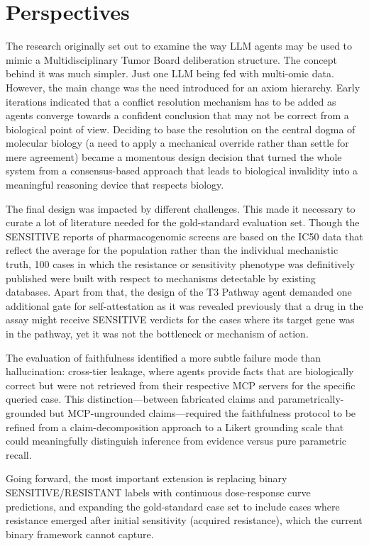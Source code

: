 \documentclass{article}
\begin{document}
\section{Perspectives}

The research originally set out to examine the way LLM agents may be used to mimic a Multidisciplinary Tumor Board deliberation structure. The concept behind it was much simpler. Just one LLM being fed with multi-omic data.  However, the main change was the need introduced for an axiom hierarchy. Early iterations indicated that a conflict resolution mechanism has to be added as agents converge towards a confident conclusion that may not be correct from a biological point of view. Deciding to base the resolution on the central dogma of molecular biology (a need to apply a mechanical override rather than settle for mere agreement) became a momentous design decision that turned the whole system from a consensus-based approach that leads to biological invalidity into a meaningful reasoning device that respects biology.

The final design was impacted by different challenges. This made it necessary to curate a lot of literature needed for the gold-standard evaluation set. Though the SENSITIVE reports of pharmacogenomic screens are based on the IC50 data that reflect the average for the population rather than the individual mechanistic truth, 100 cases in which the resistance or sensitivity phenotype was definitively published were built with respect to mechanisms detectable by existing databases. Apart from that, the design of the T3 Pathway agent demanded one additional gate for self-attestation as it was revealed previously that a drug in the assay might receive SENSITIVE verdicts for the cases where its target gene was in the pathway, yet it was not the bottleneck or mechanism of action.

The evaluation of faithfulness identified a more subtle failure mode than hallucination: cross-tier leakage, where agents provide facts that are biologically correct but were not retrieved from their respective MCP servers for the specific queried case. This distinction---between fabricated claims and parametrically-grounded but MCP-ungrounded claims---required the faithfulness protocol to be refined from a claim-decomposition approach to a Likert grounding scale that could meaningfully distinguish inference from evidence versus pure parametric recall. 

Going forward, the most important extension is replacing binary SENSITIVE/RESISTANT labels with continuous dose-response curve predictions, and expanding the gold-standard case set to include cases where resistance emerged after initial sensitivity (acquired resistance), which the current binary framework cannot capture.


\end{document}
